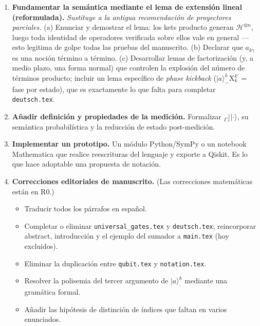 \documentclass[12pt, a4paper]{article}
\newcommand{\gate}[1]{\text{#1}}
\newcommand{\stateket}[3]{\ket{#1}^{#2}_{#3}}
\newcommand{\stategate}[3]{\gate{#1}^{#2}_{#3}}
\newcommand{\ket}[1]{|#1\rangle}
\begin{document}
\begin{enumerate}[label=\textbf{R\arabic*.}, start=0]
  \item \textbf{Fundamentar la semántica mediante el lema de extensión
          lineal (reformulada).}
        \emph{Sustituye a la antigua recomendación de proyectores parciales.}
        (a) Enunciar y demostrar el lema: los kets producto generan
        $\mathcal{H}^{\otimes n}$, luego toda identidad de operadores
        verificada sobre ellos vale en general --- esto legitima de golpe
        todas las pruebas del manuscrito.
        (b) Declarar que $a_{k\gamma}$ es una noción término a término.
        (c) Desarrollar lemas de factorización (y, a medio plazo, una forma
        normal) que controlen la explosión del número de términos producto;
        incluir un lema específico de \emph{phase kickback}
        ($\stateket{a}{k}{-}\stategate{X}{k'}{k} = $ fase por estado), que es
        exactamente lo que falta para completar \texttt{deutsch.tex}.

  \item \textbf{Añadir definición y propiedades de la medición.}
        Formalizar $_{{\Gamma}}\rfloor\ket{\cdot}$, su semántica probabilística
        y la reducción de estado post-medición.

  \item \textbf{Implementar un prototipo.}
        Un módulo Python/SymPy o un notebook Mathematica que realice
        reescrituras del lenguaje y exporte a Qiskit. Es lo que hace adoptable
        una propuesta de notación.

  \item \textbf{Correcciones editoriales de manuscrito.}
        (Las correcciones matemáticas están en R0.)
        \begin{itemize}
          \item Traducir todos los párrafos en español.
          \item Completar o eliminar \texttt{universal\_gates.tex} y
                \texttt{deutsch.tex}; reincorporar abstract, introducción y
                el ejemplo del sumador a \texttt{main.tex} (hoy excluidos).
          \item Eliminar la duplicación entre \texttt{qubit.tex} y
                \texttt{notation.tex}.
          \item Resolver la polisemia del tercer argumento de
                $\stateket{a}{k}{\cdot}$ mediante una gramática formal.
          \item Añadir las hipótesis de distinción de índices que faltan en
                varios enunciados.
        \end{itemize}
\end{enumerate}
\end{document}
